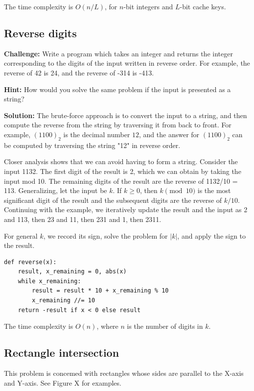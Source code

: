 \documentclass[11pt,a4paper]{article}
\begin{document}
The time complexity is $O(n/L)$, for $n$-bit integers and $L$-bit cache keys.

\subsection{Reverse digits}

\textbf{Challenge:} Write a program which takes an integer and returns the
integer corresponding to the digits of the input written in reverse order. For
example, the reverse of 42 is 24, and the reverse of -314 is -413.

\textbf{Hint:} How would you solve the same problem if the input is presented
as a string?

\textbf{Solution:} The brute-force approach is to convert the input to a 
string, and then compute the reverse from the string by traversing it from 
back to front. For example, $(1100)_2$ is the decimal number $12$, and the 
answer for $(1100)_2$ can be computed by traversing the string "12" in reverse
order.

Closer analysis shows that we can avoid having to form a string. Consider the
input 1132. The first digit of the result is 2, which we can obtain by taking
the input mod 10. The remaining digits of the result are the reverse of 
1132/10 = 113. Generalizing, let the input be $k$. If $k \geq 0$, then $k 
\pmod{10}$ is the most significant digit of the result and the subsequent
digits are the reverse of $k/10$. Continuing with the example, we iteratively
update the result and the input as 2 and 113, then 23 and 11, then 231 and 1,
then 2311.

For general $k$, we record its sign, solve the problem for $|k|$, and apply
the sign to the result.

\begin{verbatim}
def reverse(x):
    result, x_remaining = 0, abs(x)
    while x_remaining:
        result = result * 10 + x_remaining % 10
        x_remaining //= 10
    return -result if x < 0 else result
\end{verbatim}

The time complexity is $O(n)$, where $n$ is the number of digits in $k$.

\subsection{Rectangle intersection}

This problem is concemed with rectangles whose sides are parallel to the 
X-axis and Y-axis. See Figure X for examples.
\end{document}
